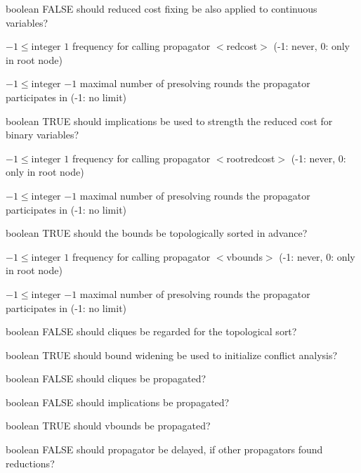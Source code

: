 %
{boolean}%
{FALSE}%
{should reduced cost fixing be also applied to continuous variables?}%
{}

%
{$-1\leq\textrm{integer}$}%
{$1$}%
{frequency for calling propagator $<$redcost$>$ (-1: never, 0: only in root node)}%
{}

%
{$-1\leq\textrm{integer}$}%
{$-1$}%
{maximal number of presolving rounds the propagator participates in (-1: no limit)}%
{}

%
{boolean}%
{TRUE}%
{should implications be used to strength the reduced cost for binary variables?}%
{}

%
{$-1\leq\textrm{integer}$}%
{$1$}%
{frequency for calling propagator $<$rootredcost$>$ (-1: never, 0: only in root node)}%
{}

%
{$-1\leq\textrm{integer}$}%
{$-1$}%
{maximal number of presolving rounds the propagator participates in (-1: no limit)}%
{}

%
{boolean}%
{TRUE}%
{should the bounds be topologically sorted in advance?}%
{}

%
{$-1\leq\textrm{integer}$}%
{$1$}%
{frequency for calling propagator $<$vbounds$>$ (-1: never, 0: only in root node)}%
{}

%
{$-1\leq\textrm{integer}$}%
{$-1$}%
{maximal number of presolving rounds the propagator participates in (-1: no limit)}%
{}

%
{boolean}%
{FALSE}%
{should cliques be regarded for the topological sort?}%
{}

%
{boolean}%
{TRUE}%
{should bound widening be used to initialize conflict analysis?}%
{}

%
{boolean}%
{FALSE}%
{should cliques be propagated?}%
{}

%
{boolean}%
{FALSE}%
{should implications be propagated?}%
{}

%
{boolean}%
{TRUE}%
{should vbounds be propagated?}%
{}

%
{boolean}%
{FALSE}%
{should propagator be delayed, if other propagators found reductions?}%
{}

